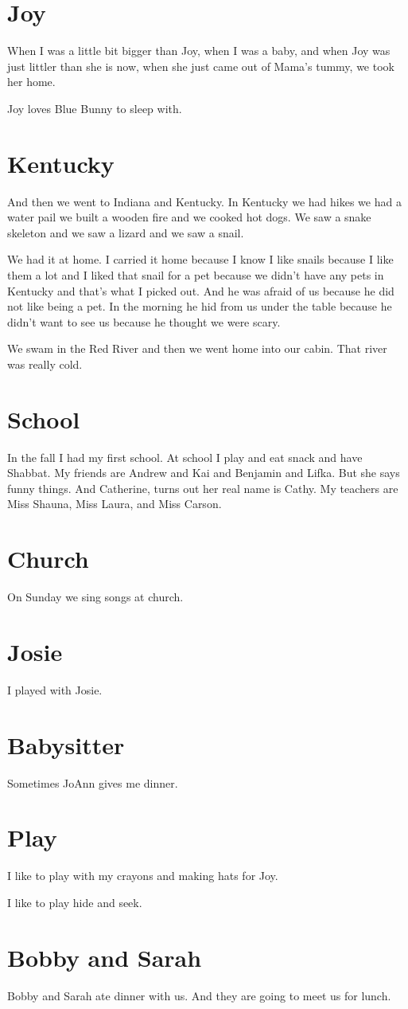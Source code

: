 \documentclass[12pt]{article}
\begin{document}
\section*{Joy}

When I was a little bit bigger than Joy,
when I was a baby,
and when Joy was just littler than she is now,
when she just came out of Mama's tummy,
we took her home.

Joy loves Blue Bunny to sleep with.

\section*{Kentucky}

And then we went to Indiana and Kentucky.
In Kentucky we had hikes
we had a water pail
we built a wooden fire and we cooked hot dogs.
We saw a snake skeleton and we saw a lizard
and we saw a snail.

We had it at home.
I carried it home because I know I like snails
because I like them a lot
and I liked that snail for a pet
because we didn't have any pets in Kentucky 
and that's what I picked out.
And he was afraid of us because he did not like being a pet.
In the morning he hid from us under the table
because he didn't want to see us 
because he thought we were scary.

We swam in the Red River
and then we went home into our cabin.
That river was really cold.

\section*{School}

In the fall I had my first school.
At school I play 
and eat snack 
and have Shabbat.
My friends are Andrew and Kai and Benjamin and Lifka.
But she says funny things.
And Catherine, turns out her real name is Cathy.
My teachers are Miss Shauna, Miss Laura, and Miss Carson.

\section*{Church}

On Sunday we sing songs at church.

\section*{Josie}

I played with Josie.

\section*{Babysitter}

Sometimes JoAnn gives me dinner.

\section*{Play}

I like to play with my crayons and making hats for Joy.

I like to play hide and seek.

\section*{Bobby and Sarah}
Bobby and Sarah ate dinner with us.
And they are going to meet us for lunch.
\end{document}
